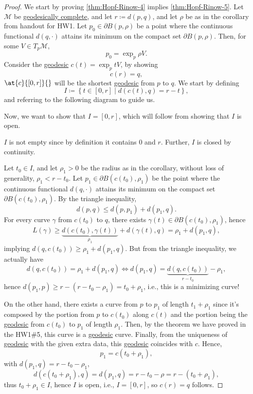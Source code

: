 \begin{proof}
	We start by proving \autoref{thm:Hopf-Rinow-4} implies \autoref{thm:Hopf-Rinow-5}. Let \(\mathcal{M} \) be \hyperref[def:geodesically-complete]{geodesically complete}, and let \(r \coloneqq d(p, q)\), and let \(\rho \) be as in the corollary from handout for HW1. Let \(p_0 \in \partial B(p, \rho )\) be a point where the continuous functional \(d(q, \cdot)\) attains its minimum on the compact set \(\partial B(p, \rho )\). Then, for some \(V \in T_p \mathcal{M} \),
	\[
		p_0 = \exp _p \rho V.
	\]
	Consider the \hyperref[def:geodesic]{geodesic} \(c(t) = \exp _p tV\), by showing
	\[
		c(r) = q,
	\]
	\(\at{c}{[0, r]}{} \) will be the shortest \hyperref[def:geodesic]{geodesic} from \(p\) to \(q\). We start by defining
	\[
		I\coloneqq \left\{ t\in[0, r] \mid d(c(t), q) = r-t \right\},
	\]
	and referring to the following diagram to guide us.
	\begin{center}
	\end{center}

	Now, we want to show that \(I = [0, r]\), which will follow from showing that \(I\) is open.
	\begin{note}
		\(I\) is not empty since by definition it contains \(0\) and \(r\). Further, \(I\) is closed by continuity.
	\end{note}
	Let \(t_0 \in I\), and let \(\rho _1 > 0\) be the radius as in the corollary, without loss of generality, \(\rho _1 < r-t_0\). Let \(p_1\in \partial B(c(t_0), \rho _1)\) be the point where the continuous functional \(d(q, \cdot)\) attains its minimum on the compact set \(\partial B(c(t_0), \rho _1)\). By the triangle inequality,
	\[
		d(p, q) \leq d(p, p_1) + d(p_1, q).
	\]
	For every curve \(\gamma \) from \(c(t_0)\) to \(q\), there exists \(\gamma (t)\in \partial B(c(t_0), \rho _1)\), hence
	\[
		L(\gamma )
		\geq \underbrace{d(c(t_0), \gamma (t))}_{\rho _1} + d(\gamma (t), q)
		= \rho _1 + d(p_1, q),
	\]
	implying \(d(q, c(t_0)) \geq \rho _1 + d(p_1, q)\). But from the triangle inequality, we actually have
	\[
		d(q, c(t_0)) = \rho _1 + d(p_1, q)
		\iff d(p_1, q) = \underbrace{d(q, c(t_0))}_{r-t_0} - \rho _1,
	\]
	hence \(d(p_1, p) \geq r-(r-t_0 - \rho _1) = t_0 + \rho _1\), i.e., this is a minimizing curve!

	On the other hand, there exists a curve from \(p\) to \(p_1\) of length \(t_1 + \rho _1\) since it's composed by the portion from \(p\) to \(c(t_0)\) along \(c(t)\) and the portion being the \hyperref[def:geodesic]{geodesic} from \(c(t_0)\) to \(p_1\) of length \(\rho _1\). Then, by the theorem we have proved in the HW1\#5, this curve is a \hyperref[def:geodesic]{geodesic} curve. Finally, from the uniqueness of \hyperref[def:geodesic]{geodesic} with the given extra data, this \hyperref[def:geodesic]{geodesic} coincides with \(c\). Hence,
	\[
		p_1 = c ( t_0 + \rho _1),
	\]
	with \(d(p_1, q) = r-t_0 - \rho _1\),
	\[
		d(c(t_0 + \rho _1), q)
		= d(p_1, q)
		= r - t_0 - \rho
		= r-(t_0 + \rho _1),
	\]
	thus \(t_0 + \rho _1\in I\), hence \(I\) is open, i.e., \(I = [0, r]\), so \(c(r) = q\) follows.
\end{proof}